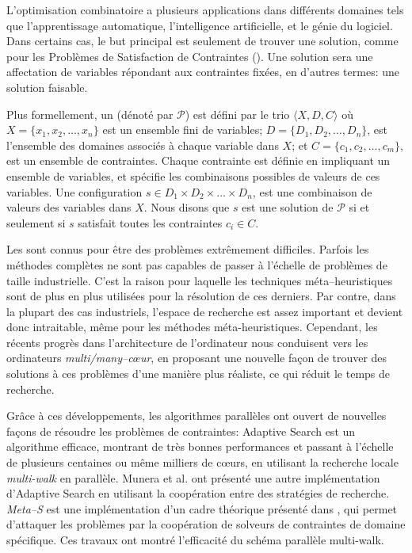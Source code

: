 L'optimisation combinatoire a plusieurs applications dans diff\'erents domaines tels que l'apprentissage automatique, l'intelligence artificielle, et le g\'enie du logiciel. Dans certains cas, le but principal est seulement de trouver une solution, comme pour les Probl\`emes de Satisfaction de Contraintes (\csp). Une solution sera une affectation de variables r\'epondant aux contraintes fix\'ees, en d'autres termes: une solution faisable.

Plus formellement, un \csp{} (d\'enot\'e par $\mathcal{P}$) est d\'efini par le trio $\langle X,D,C \rangle$  o\`u $X = \{x_1, x_2,\dots,x_n\}$ est un ensemble fini de variables; $D = \{D_1, D_2,\dots, D_n\}$, est l'ensemble des domaines associ\'es \`a chaque variable dans $X$; et $C = \{c_1, c_2,\dots,c_m\}$, est un ensemble de contraintes. Chaque contrainte est d\'efinie en impliquant un ensemble de variables, et sp\'ecifie les combinaisons possibles de valeurs de ces variables. Une configuration $s\in D_1\times D_2\times\dots\times D_n$, est une combinaison de valeurs des variables dans $X$. Nous disons que $s$ est une solution de $\mathcal{P}$ si et seulement si $s$ satisfait toutes les contraintes $c_i \in C$.

Les \csps{} sont connus pour \^etre des probl\`emes extr\^emement difficiles. Parfois les m\'ethodes compl\`etes ne sont pas capables de passer \`a l'\'echelle de probl\`emes de taille industrielle. C'est la raison  pour laquelle les techniques m\'eta--heuristiques sont de plus en plus utilis\'ees pour la r\'esolution de ces derniers. Par contre, dans la plupart des cas industriels, l'espace de recherche est assez important et devient donc intraitable, m\^eme pour les m\'ethodes m\'eta-heuristiques. Cependant, les r\'ecents progr\`es dans l'architecture de l'ordinateur nous conduisent vers les ordinateurs {\it multi/many--c\oe ur}, en proposant une nouvelle fa\c{c}on de trouver des solutions \`a ces probl\`emes d'une mani\`ere plus r\'ealiste, ce qui r\'eduit le temps de recherche.

Gr\^ace \`a ces d\'eveloppements, les algorithmes parall\`eles ont ouvert de nouvelles fa\c{c}ons de r\'esoudre les probl\`emes de contraintes: Adaptive Search \cite{Diaz} est un algorithme efficace, montrant de tr\`es bonnes performances et passant \`a l'\'echelle de plusieurs centaines ou m\^eme milliers de c\oe urs, en utilisant la recherche locale {\it multi-walk} en parall\`ele. Munera et al. \cite{Munera} ont pr\'esent\'e une autre impl\'ementation d'Adaptive Search en utilisant la coop\'eration entre des strat\'egies de recherche. {\it Meta--S} est une impl\'ementation d'un cadre th\'eorique pr\'esent\'e dans \cite{Frank2003}, qui permet d'attaquer les probl\`emes par la coop\'eration de solveurs de contraintes de domaine sp\'ecifique. 
Ces travaux ont montr\'e l'efficacit\'e du sch\'ema parall\`ele multi-walk.  

